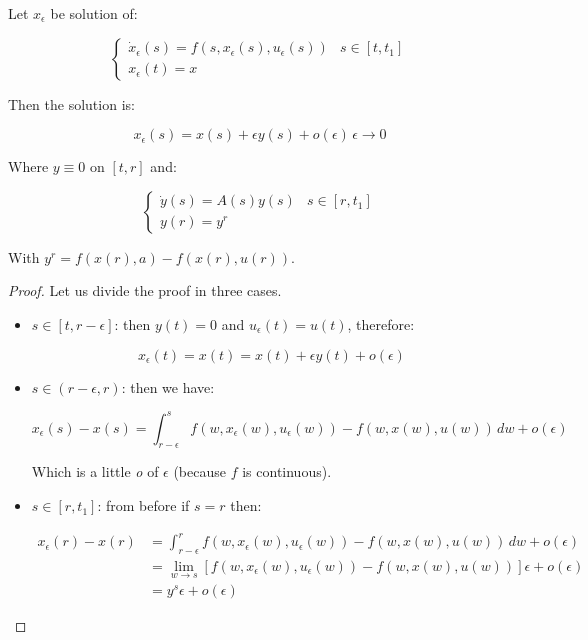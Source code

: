 \begin{lemma}
    Let $x_{\epsilon}$ be solution of:

    \begin{equation}\label{1-proofpontry-dynamprob}
        \begin{cases}
            \dot{x}_{\epsilon}(s) = f(s,x_{\epsilon}(s),u_{\epsilon}(s)) & s\in[t,t_1] \\
            x_{\epsilon}(t) = x
        \end{cases}
    \end{equation}

    Then the solution is:

    \begin{equation}\label{1-proofpontry-solvar}
        x_{\epsilon}(s) = x(s) + \epsilon y(s) + o(\epsilon)\, \epsilon\to0
    \end{equation}

    Where $y\equiv0$ on $[t,r]$ and:

    \begin{equation}
        \begin{cases}
            \dot{y}(s) = A(s)y(s) & s\in[r,t_1]\\
            y(r) = y^r
        \end{cases}
    \end{equation}

    With $y^r=f(x(r),a)-f(x(r),u(r))$.

    \begin{proof}
        Let us divide the proof in three cases.

        \begin{itemize}
            \item $s\in[t,r-\epsilon]$: then $y(t)=0$ and $u_{\epsilon}(t)=u(t)$, therefore:
            
            \[x_{\epsilon}(t)=x(t)=x(t)+\epsilon y(t)+o(\epsilon)\]

            \item $s\in(r-\epsilon,r)$: then we have:
            
            \[x_{\epsilon}(s)-x(s) = \int_{r-\epsilon}^s f(w,x_{\epsilon}(w),u_{\epsilon}(w))-f(w,x(w),u(w)) \,dw + o(\epsilon)\]

            Which is a little \textit{o} of $\epsilon$ (because $f$ is continuous). 

            \item $s\in[r,t_1]$: from before if $s=r$ then:
            
            \begin{align}
                x_{\epsilon}(r)-x(r) & = \int_{r-\epsilon}^r f(w,x_{\epsilon}(w),u_{\epsilon}(w))-f(w,x(w),u(w)) \,dw + o(\epsilon) \\
                & = \lim_{w\to s}[f(w,x_{\epsilon}(w),u_{\epsilon}(w))-f(w,x(w),u(w))]\epsilon+ o(\epsilon) \\
                & = y^s\epsilon + o(\epsilon)
            \end{align}


\end{itemize}
\end{proof}
\end{lemma}
